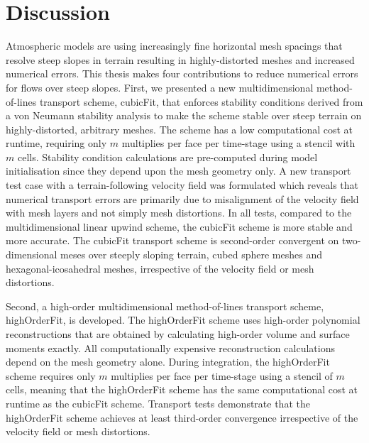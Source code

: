 \chapter{Discussion}
\label{ch:discussion}


Atmospheric models are using increasingly fine horizontal mesh spacings that resolve steep slopes in terrain resulting in highly-distorted meshes and increased numerical errors.
This thesis makes four contributions to reduce numerical errors for flows over steep slopes.
First, we presented a new multidimensional method-of-lines transport scheme, cubicFit, that enforces stability conditions derived from a von Neumann stability analysis to make the scheme stable over steep terrain on highly-distorted, arbitrary meshes.
The scheme has a low computational cost at runtime, requiring only $m$ multiplies per face per time-stage using a stencil with $m$ cells.
Stability condition calculations are pre-computed during model initialisation since they depend upon the mesh geometry only.
A new transport test case with a terrain-following velocity field was formulated which reveals that numerical transport errors are primarily due to misalignment of the velocity field with mesh layers and not simply mesh distortions.
In all tests, compared to the multidimensional linear upwind scheme, the cubicFit scheme is more stable and more accurate.
The cubicFit transport scheme is second-order convergent on two-dimensional meses over steeply sloping terrain, cubed sphere meshes and hexagonal-icosahedral meshes, irrespective of the velocity field or mesh distortions.

Second, a high-order multidimensional method-of-lines transport scheme, highOrderFit, is developed.
The highOrderFit scheme uses high-order \kexact polynomial reconstructions that are obtained by calculating high-order volume and surface moments exactly.
All computationally expensive reconstruction calculations depend on the mesh geometry alone.
During integration, the highOrderFit scheme requires only $m$ multiplies per face per time-stage using a stencil of $m$ cells, meaning that the highOrderFit scheme has the same computational cost at runtime as the cubicFit scheme.
Transport tests demonstrate that the highOrderFit scheme achieves at least third-order convergence irrespective of the velocity field or mesh distortions.

